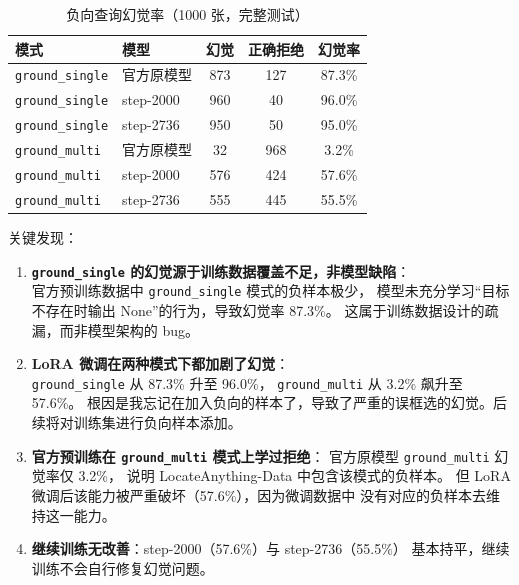 \documentclass[11pt,a4paper]{article}
\begin{document}
\begin{table}[H]
\centering\small
\caption{负向查询幻觉率（1000 张，完整测试）}\label{tab:hall}
\begin{tabularx}{\textwidth}{llccc}
\toprule
\textbf{模式} & \textbf{模型} & \textbf{幻觉} & \textbf{正确拒绝} & \textbf{幻觉率} \\
\midrule
\texttt{ground\_single} & 官方原模型 & 873 & 127 & 87.3\% \\
\texttt{ground\_single} & step-2000  & 960 & 40  & 96.0\% \\
\texttt{ground\_single} & step-2736  & 950 & 50  & 95.0\% \\
\midrule
\texttt{ground\_multi}  & 官方原模型 & 32  & 968 & 3.2\% \\
\texttt{ground\_multi}  & step-2000  & 576 & 424 & 57.6\% \\
\texttt{ground\_multi}  & step-2736  & 555 & 445 & 55.5\% \\
\bottomrule
\end{tabularx}
\end{table}

关键发现：

\begin{enumerate}
\item \textbf{\texttt{ground\_single} 的幻觉源于训练数据覆盖不足，非模型缺陷}：\\
      官方预训练数据中 \texttt{ground\_single} 模式的负样本极少，
      模型未充分学习``目标不存在时输出 None''的行为，导致幻觉率 87.3\%。
      这属于训练数据设计的疏漏，而非模型架构的 bug。

\item \textbf{LoRA 微调在两种模式下都加剧了幻觉}：\\
      \texttt{ground\_single} 从 87.3\% 升至 96.0\%，
      \texttt{ground\_multi} 从 3.2\% 飙升至 57.6\%。
      根因是我忘记在加入负向的样本了，导致了严重的误框选的幻觉。后续将对训练集进行负向样本添加。

\item \textbf{官方预训练在 \texttt{ground\_multi} 模式上学过拒绝}：
      官方原模型 \texttt{ground\_multi} 幻觉率仅 3.2\%，
      说明 LocateAnything-Data 中包含该模式的负样本。
      但 LoRA 微调后该能力被严重破坏（57.6\%），因为微调数据中
      没有对应的负样本去维持这一能力。

\item \textbf{继续训练无改善}：step-2000（57.6\%）与 step-2736（55.5\%）
      基本持平，继续训练不会自行修复幻觉问题。
\end{enumerate}
\end{document}
